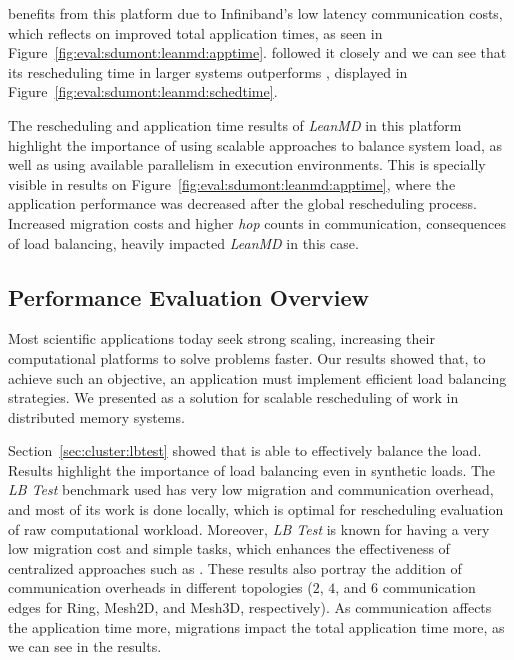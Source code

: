 \distributedlb benefits from this platform due to Infiniband's low latency communication costs, which reflects on improved total application times, as seen in Figure~\ref{fig:eval:sdumont:leanmd:apptime}.
\packdrop followed it closely and we can see that its rescheduling time in larger systems outperforms \distributedlb, displayed in Figure~\ref{fig:eval:sdumont:leanmd:schedtime}.

The rescheduling and application time results of \textit{LeanMD} in this platform highlight the importance of using scalable approaches to balance system load, as well as using available parallelism in execution environments.
This is specially visible in \greedylb results on Figure~\ref{fig:eval:sdumont:leanmd:apptime}, where the application performance was decreased after the global rescheduling process.
Increased migration costs and higher \textit{hop} counts in communication, consequences of load balancing, heavily impacted \textit{LeanMD} in this case.

\subsection{Performance Evaluation Overview} \label{eval:overview}

Most scientific applications today seek strong scaling, increasing their computational platforms to solve problems faster.
Our results showed that, to achieve such an objective, an application must implement efficient load balancing strategies.
We presented \packdrop as a solution for scalable rescheduling of work in distributed memory systems.

Section~\ref{sec:cluster:lbtest} showed that \packdrop is able to effectively balance the load. 
Results highlight the importance of load balancing even in synthetic loads.
The \textit{LB Test} benchmark used has very low migration and communication overhead, and most of its work is done locally, which is optimal for rescheduling evaluation of raw computational workload.
Moreover, \textit{LB Test} is known for having a very low migration cost and simple tasks, which enhances the effectiveness of centralized approaches such as .
These results also portray the addition of communication overheads in different topologies ($2$, $4$, and $6$ communication edges for Ring, Mesh2D, and Mesh3D, respectively). %
As communication affects the application time more, migrations impact the total application time more, as we can see in the \greedylb results.


